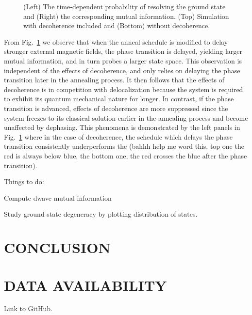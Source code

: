 \documentclass[prd,twocolumn,tightenlines,preprintnumbers,showpacs,superscriptaddress,notitlepage,nofootinbib,eqsecnum,floatfix,longbibliography]{revtex4}
\begin{document}
\begin{figure}
    \caption{(Left) The time-dependent probability of resolving the ground state and (Right) the corresponding mutual information.
(Top) Simulation with decoherence included and (Bottom) without decoherence.}
    \label{fig:prob_mi}
\end{figure}

From Fig.~\ref{fig:prob_mi} we observe that when the anneal schedule is modified to delay stronger external magnetic fields, the phase transition is delayed, yielding larger mutual information, and in turn probes a larger state space.
This observation is independent of the effects of decoherence, and only relies on delaying the phase transition later in the annealing process.
It then follows that the effects of decoherence is in competition with delocalization because the system is required to exhibit its quantum mechanical nature for longer.
In contrast, if the phase transition is advanced, effects of decoherence are more suppressed since the system freezes to its classical solution earlier in the annealing process and {\color{blue}become unaffected by dephasing.} This phenomena is demonstrated by the left panels in Fig.~\ref{fig:prob_mi} where in the case of decoherence, the schedule which delays the phase transition consistently underperforms the (bahhh help me word this.
top one the red is always below blue, the bottom one, the red crosses the blue after the phase transition).

Things to do:

Compute dwave mutual information

Study ground state degeneracy by plotting distribution of states.

\section{CONCLUSION}


\section{DATA AVAILABILITY}

Link to GitHub.

\end{document}
